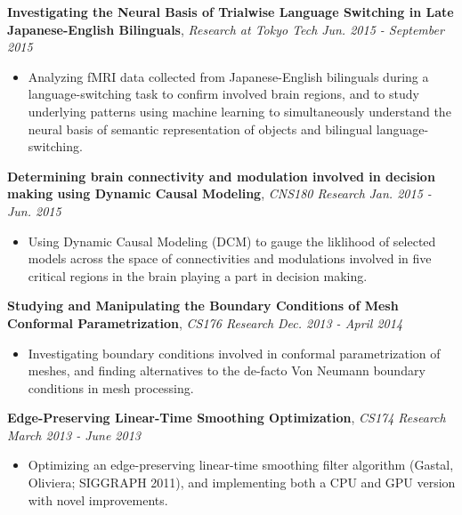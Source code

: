 \documentclass[9pt]{article}
\newenvironment{changemargin}[2]{%
  \begin{list}{}{%
    \setlength{\topsep}{0pt}%
    \setlength{\leftmargin}{#1}%
    \setlength{\rightmargin}{#2}%
    \setlength{\listparindent}{\parindent}%
    \setlength{\itemindent}{\parindent}%
    \setlength{\parsep}{\parskip}%
  }%
  \item[]}{\end{list}
}
\newenvironment{body} {
	\vspace*{-16pt}
	\begin{changemargin}{-0.25in}{-0.5in}
  }	
	{\end{changemargin}
}
\begin{document}
\begin{body}
	\textbf{Investigating the Neural Basis of Trialwise Language Switching in Late Japanese-English Bilinguals}, \emph{Research at Tokyo Tech} \hfill \emph{Jun. 2015 - September 2015} \\
		\vspace*{-3pt}
	\begin{itemize} \itemsep -0pt
	\item Analyzing fMRI data collected from Japanese-English bilinguals during a language-switching task to confirm involved brain regions, and to study underlying patterns using machine learning to simultaneously understand the neural basis of semantic representation of objects and bilingual language-switching.
	\end{itemize}
	\textbf{Determining brain connectivity and modulation involved in decision making using Dynamic Causal Modeling}, \emph{CNS180 Research} \hfill \emph{Jan. 2015 - Jun. 2015} \\
		\vspace*{-3pt}
	\begin{itemize} \itemsep -0pt
	\item Using Dynamic Causal Modeling (DCM) to gauge the liklihood of selected models across the space of connectivities and modulations involved in five critical regions in the brain playing a part in decision making.
	\end{itemize}
	\textbf{Studying and Manipulating the Boundary Conditions of Mesh Conformal Parametrization}, \emph{CS176 Research} \hfill \emph{Dec. 2013 - April 2014} \\
		\vspace*{-3pt}
	\begin{itemize} \itemsep -0pt
	\item Investigating boundary conditions involved in conformal parametrization of meshes, and finding alternatives to the de-facto Von Neumann boundary conditions in mesh processing.
	\end{itemize}
	\textbf{Edge-Preserving Linear-Time Smoothing Optimization}, \emph{CS174 Research} \hfill \emph{March 2013 - June 2013} \\
		\vspace*{-3pt}
	\begin{itemize} \itemsep -0pt
		\item Optimizing an edge-preserving linear-time smoothing filter algorithm (Gastal, Oliviera; SIGGRAPH 2011), and implementing both a CPU and GPU version with novel improvements.

\end{itemize}
\end{body}
\end{document}
